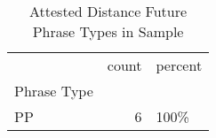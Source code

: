 \begin{table}[htbp!]
\centering
\caption{Attested Distance Future Phrase Types in Sample}
\label{table:distfut_phtype_ct}
\begin{tabular}{lrl}
\toprule
{} &  count & percent \\
Phrase Type &        &         \\
\midrule
PP          &      6 &    100\% \\
\bottomrule
\end{tabular}
\end{table}
